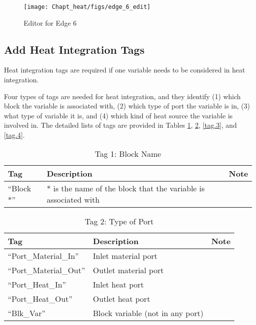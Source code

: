 \begin{figure}[H]
	\begin{center}
		\texttt{[image: Chapt\_heat/figs/edge\_6\_edit]}
		\caption{Editor for Edge 6}
		\label{edge.6.edit}
	\end{center}
\end{figure}

\subsection{Add Heat Integration Tags}

Heat integration tags are required if one variable needs to be considered in heat integration.

Four types of tags are needed for heat integration, and they identify (1) which block the variable is associated with, (2) which type of port the variable is in, (3) what type of variable it is, and (4) which kind of heat source the variable is involved in. The detailed lists of tags are provided in Tables \ref{tag.1}, \ref{tag.2}, \ref{tag.3}, and \ref{tag.4}.

\begin{table}[H]
	\begin{center}
		\caption{Tag 1: Block Name}
		\label{tag.1}
		\begin{tabular}{l p{6cm} p{6cm}}
			\toprule
			\textbf{Tag}	& \textbf{Description} 		& \textbf{Note} 	\\
			\midrule
			``Block *'' 	& * is the name of the block that the variable is associated with 	&	\\
			\bottomrule
		\end{tabular}
	\end{center}
\end{table}

\begin{table}[H]
	\begin{center}
		\caption{Tag 2: Type of Port}
		\label{tag.2}
		\begin{tabular}{l p{6cm} p{6cm}}
			\toprule
			\textbf{Tag}			& \textbf{Description} 		& \textbf{Note} 	\\
			\midrule
			``Port\_Material\_In''	& Inlet material port 		& 		\\
			``Port\_Material\_Out''	& Outlet material port 		& 		\\	
			``Port\_Heat\_In''	 	& Inlet heat port 			& 		\\	
			``Port\_Heat\_Out''		& Outlet heat port 			& 		\\	
			``Blk\_Var'' 			& Block variable (not in any port) 	& 		\\
			\bottomrule
		\end{tabular}
	\end{center}
\end{table}

